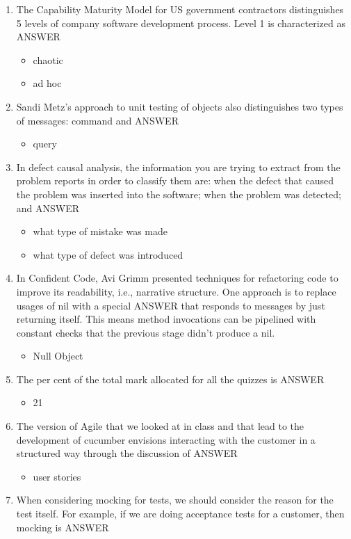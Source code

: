 \documentclass{exam}
\begin{document}
\begin{enumerate}
\item The Capability Maturity Model for US government contractors distinguishes 5 levels of company software development process.  Level 1 is characterized as ANSWER
\begin{itemize}
\item chaotic
\item ad hoc
\end{itemize}
\item Sandi Metz's approach to unit testing of objects also distinguishes two types of messages: command and ANSWER
\begin{itemize}
\item query
\end{itemize}
\item In defect causal analysis, the information you are trying to extract from the problem reports in order to classify them are: when the defect that caused the problem was inserted into the software; when the problem was detected; and ANSWER
\begin{itemize}
\item what type of mistake was made
\item what type of defect was introduced
\end{itemize}
\item In Confident Code, Avi Grimm presented techniques for refactoring code to improve its readability, i.e., narrative structure.  One approach is to replace usages of nil with a special ANSWER that responds to messages by just returning itself.  This means method invocations can be pipelined with constant checks that the previous stage didn't produce a nil.
\begin{itemize}
\item Null Object
\end{itemize}
\item The per cent of the total mark allocated for all the quizzes is ANSWER
\begin{itemize}
\item 21
\end{itemize}
\item The version of Agile that we looked at in class and that lead to the development of cucumber envisions interacting with the customer in a structured way through the discussion of ANSWER
\begin{itemize}
\item user stories
\end{itemize}
\item When considering mocking for tests, we should consider the reason for the test itself.  For example, if we are doing acceptance tests for a customer, then mocking is ANSWER

\end{enumerate}
\end{document}
